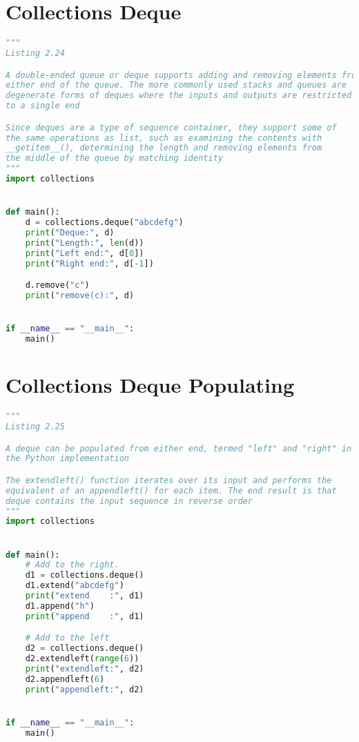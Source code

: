 \documentclass[a4paper,landscape]{report}
\begin{document}
\section{Collections Deque}
\begin{lstlisting}[language=Python]
"""
Listing 2.24

A double-ended queue or deque supports adding and removing elements from
either end of the queue. The more commonly used stacks and queues are
degenerate forms of deques where the inputs and outputs are restricted
to a single end

Since deques are a type of sequence container, they support some of
the same operations as list, such as examining the contents with
__getitem__(), determining the length and removing elements from
the middle of the queue by matching identity
"""
import collections


def main():
    d = collections.deque("abcdefg")
    print("Deque:", d)
    print("Length:", len(d))
    print("Left end:", d[0])
    print("Right end:", d[-1])

    d.remove("c")
    print("remove(c):", d)


if __name__ == "__main__":
    main()

\end{lstlisting}
\section{Collections Deque Populating}
\begin{lstlisting}[language=Python]
"""
Listing 2.25

A deque can be populated from either end, termed "left" and "right" in
the Python implementation

The extendleft() function iterates over its input and performs the
equivalent of an appendleft() for each item. The end result is that
deque contains the input sequence in reverse order
"""
import collections


def main():
    # Add to the right.
    d1 = collections.deque()
    d1.extend("abcdefg")
    print("extend    :", d1)
    d1.append("h")
    print("append    :", d1)

    # Add to the left
    d2 = collections.deque()
    d2.extendleft(range(6))
    print("extendleft:", d2)
    d2.appendleft(6)
    print("appendleft:", d2)


if __name__ == "__main__":
    main()


\end{lstlisting}
\end{document}
